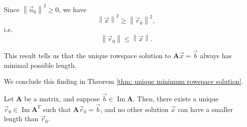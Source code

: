 \documentclass[]{book}
\DeclareMathOperator{\image}{Im}
\newcommand{\mat}[1]{\ensuremath{\mathbf{#1}}}
\begin{document}
Since $\left\|\vec{n}_0\right\|^2 \geq 0$, we have
\[\left\|\vec{x}\right\|^2 \geq \left\|\vec{r}_0\right\|^2,\]
i.e.
\[\left\|\vec{r}_0\right\| \leq \left\|\vec{x}\right\|.\]

This result tells us that the unique rowspace solution to $\mat{A}\vec{x} = \vec{b}$ always has minimal possible length.

We conclude this finding in Theorem \ref{thm: unique minimum rowspace solution}.

\begin{theorem}
    \label{thm: unique minimum rowspace solution}
    Let $\mat{A}$ be a matrix, and suppose $\vec{b} \in \image\mat{A}$. Then, there exists a unique $\vec{r}_0 \in \image\mat{A}^T$ such that $\mat{A}\vec{r}_0 = \vec{b}$, and no other solution $\vec{x}$ can have a smaller length than $\vec{r}_0$.
\end{theorem}
\end{document}
